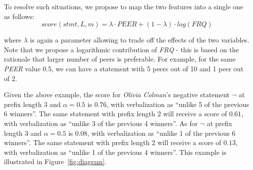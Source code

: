 To resolve such situations, we propose to map the two features into a single one as follows:
\begin{equation}
\label{eqn:context}
score(\textit{stmt},L,m) = \lambda \cdot \textit{PEER} + (1-\lambda) \cdot log(\textit{FRQ})
\end{equation}

where $\lambda$ is again a parameter allowing to trade off the effects of the two variables. Note that we propose a logarithmic contribution of \textit{FRQ} - this is based on the rationale that larger number of peers is preferable. For example, for the same \textit{PEER} value 0.5, we can have a statement with 5 peers out of 10 and 1 peer out of 2.

Given the above example, the score for \emph{Olivia Colman}'s negative statement $\neg$ at prefix length 3 and $\alpha=0.5$ is $0.76$, with verbalization as ``unlike 5 of the previous 6 winners''. The same statement with prefix length 2 will receive a score of $0.61$, with verbalization as ``unlike 3 of the previous 4 winners''. As for $\neg$ at prefix length 3 and $\alpha=0.5$ is $0.08$, with verbalization as ``unlike 1 of the previous 6 winners''.  The same statement with prefix length 2 will receive a score of $0.13$, with verbalization as ``unlike 1 of the previous 4 winners''. This example is illustrated in Figure~\ref{fig:diagram}.\\

